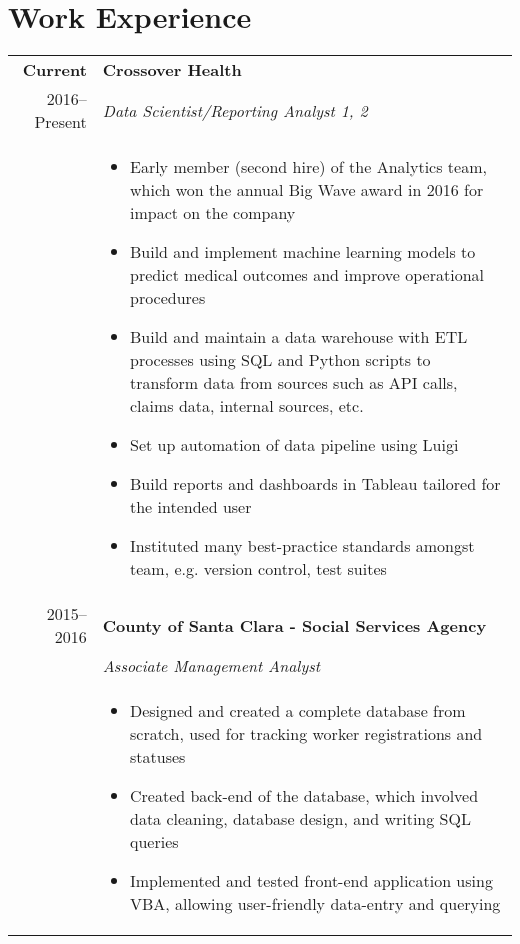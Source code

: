 \documentclass[letterpaper,10pt]{article}
\begin{document}
\nopagebreak
\section{Work Experience}
\begin{tabular}{rp{13cm}}
  \textbf{Current} & \textbf{Crossover Health} \\
 	2016--Present & \emph{Data Scientist/Reporting Analyst 1, 2} \\
		& 
			\begin{itemize}
            \item Early member (second hire) of the Analytics team, which won the annual Big Wave award in 2016 for impact on the company
			\item Build and implement machine learning models to predict medical outcomes and improve operational procedures
			\item Build and maintain a data warehouse with ETL processes using SQL and Python scripts to transform data from sources such as API calls, claims data, internal sources, etc.  
			\item Set up automation of data pipeline using Luigi
			\item Build reports and dashboards in Tableau tailored for the intended user
			\item Instituted many best-practice standards amongst team, e.g. version control, test suites
			\end{itemize}\\
	2015--2016 & \textbf{County of Santa Clara - Social Services Agency} \\
 		& \emph{Associate Management Analyst}\\
		& 
			\begin{itemize}
			\item Designed and created a complete database from scratch, used for tracking worker registrations and statuses
			\item Created back-end of the database, which involved data cleaning, database design, and writing SQL queries
			\item Implemented and tested front-end application using VBA, allowing user-friendly data-entry and querying

\end{itemize}
\end{tabular}
\end{document}
